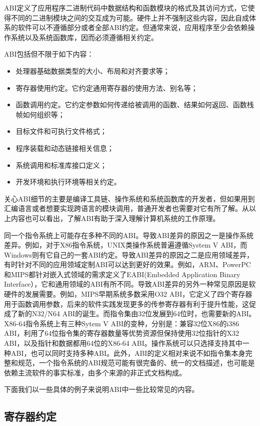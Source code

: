 \documentclass[]{ctexbook}
\providecommand{\tightlist}{%
  \setlength{\itemsep}{0pt}\setlength{\parskip}{0pt}}
\begin{document}
ABI定义了应用程序二进制代码中数据结构和函数模块的格式及其访问方式，它使得不同的二进制模块之间的交互成为可能。硬件上并不强制这些内容，因此自成体系的软件可以不遵循部分或者全部ABI约定。但通常来说，应用程序至少会依赖操作系统以及系统函数库，因而必须遵循相关约定。

ABI包括但不限于如下内容：

\begin{itemize}
\tightlist
\item
  处理器基础数据类型的大小、布局和对齐要求等；
\item
  寄存器使用约定。它约定通用寄存器的使用方法、别名等；
\item
  函数调用约定。它约定参数如何传递给被调用的函数、结果如何返回、函数栈帧如何组织等；
\item
  目标文件和可执行文件格式；
\item
  程序装载和动态链接相关信息；
\item
  系统调用和标准库接口定义；
\item
  开发环境和执行环境等相关约定。
\end{itemize}

关心ABI细节的主要是编译工具链、操作系统和系统函数库的开发者，但如果用到汇编语言或者想要实现跨语言的模块调用，普通开发者也需要对它有所了解。从以上内容也可以看出，了解ABI有助于深入理解计算机系统的工作原理。

同一个指令系统上可能存在多种不同的ABI。导致ABI差异的原因之一是操作系统差异。例如，对于X86指令系统，UNIX类操作系统普遍遵循System V ABI，而Windows则有它自己的一套ABI约定。导致ABI差异的原因之二是应用领域差异，有时针对不同的应用领域定制ABI可以达到更好的效果。例如，ARM、PowerPC和MIPS都针对嵌入式领域的需求定义了EABI(Embedded Application Binary Interface），它和通用领域的ABI有所不同。导致ABI差异的另外一种常见原因是软硬件的发展需要。例如，MIPS早期系统多数采用O32 ABI，它定义了四个寄存器用于函数调用参数，后来的软件实践发现更多的传参寄存器有利于提升性能，这促成了新的N32/N64 ABI的诞生。而指令集由32位发展到64位时，也需要新的ABI。X86-64指令系统上有三种Sytem V ABI的变种，分别是：兼容32位X86的i386 ABI，利用了64位指令集的寄存器数量等优势资源但保持使用32位指针的X32 ABI，以及指针和数据都用64位的X86-64 ABI。操作系统可以只选择支持其中一种ABI，也可以同时支持多种ABI。此外，ABI的定义相对来说不如指令集本身完整和规范，一个指令系统的ABI规范可能有很完备的、统一的文档描述，也可能是依赖主流软件的事实标准，由多个来源的非正式文档构成。

下面我们以一些具体的例子来说明ABI中一些比较常见的内容。

\hypertarget{ux5bc4ux5b58ux5668ux7ea6ux5b9a}{%
\subsection{寄存器约定}\label{ux5bc4ux5b58ux5668ux7ea6ux5b9a}}
\end{document}

